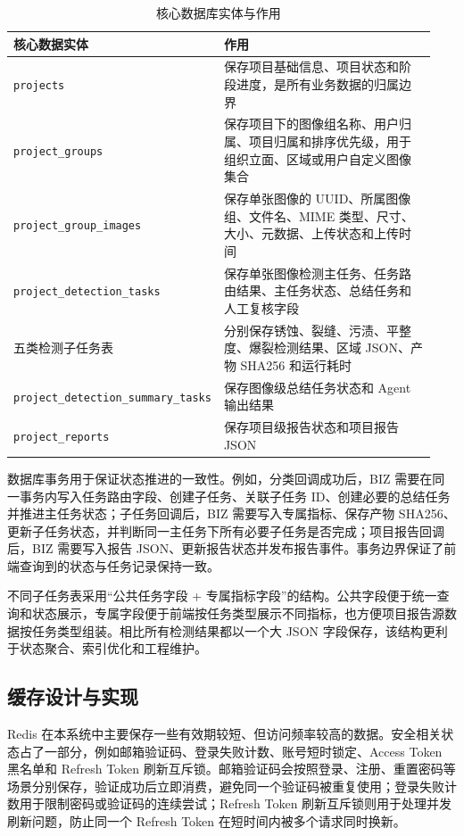 \begin{table}[!htb]
  \caption{核心数据库实体与作用}\label{tab:implementation-core-entities}
  \centering
  \begin{tabular}{@{}p{0.32\linewidth}p{0.62\linewidth}@{}} \toprule
    \textbf{核心数据实体} & \textbf{作用} \\ \midrule
    \texttt{projects} & 保存项目基础信息、项目状态和阶段进度，是所有业务数据的归属边界 \\
    \texttt{project\_groups} & 保存项目下的图像组名称、用户归属、项目归属和排序优先级，用于组织立面、区域或用户自定义图像集合 \\
    \texttt{project\_group\_images} & 保存单张图像的 UUID、所属图像组、文件名、MIME 类型、尺寸、大小、元数据、上传状态和上传时间 \\
    \texttt{project\_detection\_tasks} & 保存单张图像检测主任务、任务路由结果、主任务状态、总结任务和人工复核字段 \\
    五类检测子任务表 & 分别保存锈蚀、裂缝、污渍、平整度、爆裂检测结果、区域 JSON、产物 SHA256 和运行耗时 \\
    \texttt{project\_detection\_summary\_tasks} & 保存图像级总结任务状态和 Agent 输出结果 \\
    \texttt{project\_reports} & 保存项目级报告状态和项目报告 JSON \\ \bottomrule
  \end{tabular}
\end{table}

数据库事务用于保证状态推进的一致性。例如，分类回调成功后，BIZ 需要在同一事务内写入任务路由字段、创建子任务、关联子任务 ID、创建必要的总结任务并推进主任务状态；子任务回调后，BIZ 需要写入专属指标、保存产物 SHA256、更新子任务状态，并判断同一主任务下所有必要子任务是否完成；项目报告回调后，BIZ 需要写入报告 JSON、更新报告状态并发布报告事件。事务边界保证了前端查询到的状态与任务记录保持一致。

不同子任务表采用“公共任务字段 + 专属指标字段”的结构。公共字段便于统一查询和状态展示，专属字段便于前端按任务类型展示不同指标，也方便项目报告源数据按任务类型组装。相比所有检测结果都以一个大 JSON 字段保存，该结构更利于状态聚合、索引优化和工程维护。

\subsection{缓存设计与实现}
\label{subsec:implementation-cache-design-and-implementation}

Redis 在本系统中主要保存一些有效期较短、但访问频率较高的数据。安全相关状态占了一部分，例如邮箱验证码、登录失败计数、账号短时锁定、Access Token 黑名单和 Refresh Token 刷新互斥锁。邮箱验证码会按照登录、注册、重置密码等场景分别保存，验证成功后立即消费，避免同一个验证码被重复使用；登录失败计数用于限制密码或验证码的连续尝试；Refresh Token 刷新互斥锁则用于处理并发刷新问题，防止同一个 Refresh Token 在短时间内被多个请求同时换新。

